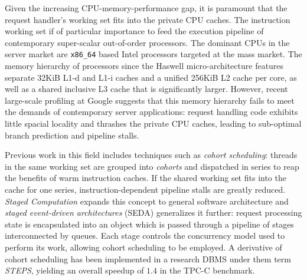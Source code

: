 \documentclass[12pt,a4paper]{book}
\begin{document}
Given the increasing CPU-memory-performance gap, it is paramount that the request handler's working set fits into the private CPU caches.
The instruction working set if of particular importance to feed the execution pipeline of contemporary super-scalar out-of-order processors.
The dominant CPUs in the server market are \texttt{x86\_64} based Intel processors targeted at the mass market.
The memory hierarchy of processors since the Haswell micro-architecture features separate 32KiB L1-d and L1-i caches and a unified 256KiB L2 cache per core, as well as a shared inclusive L3 cache that is significantly larger.
However, recent large-scale profiling at Google suggests that this memory hierarchy fails to meet the demands of contemporary server applications:
request handling code exhibits little spacial locality and thrashes the private CPU caches, leading to sub-optimal branch prediction and pipeline stalls.\cite{kanev2015profiling}

Previous work in this field includes techniques such as \emph{cohort scheduling}:
threads in the same working set are grouped into \emph{cohorts} and dispatched in series to reap the benefits of warm instruction caches.
If the shared working set fits into the cache for one series, instruction-dependent pipeline stalls are greatly reduced.
\emph{Staged Computation} expands this concept to general software architecture and \emph{staged event-driven architectures} (SEDA) generalizes it further:
request processing state is encapsulated into an object which is passed through a pipeline of stages interconnected by queues.
Each stage controls the concurrency model used to perform its work, allowing cohort scheduling to be employed.
A derivative of cohort scheduling has been implemented in a research DBMS under them term \emph{STEPS}, yielding an overall speedup of $1.4$ in the TPC-C benchmark.\cite{cohort,seda,steps,harizopoulos2005staged}
\end{document}
